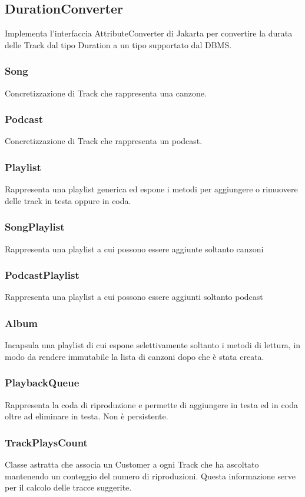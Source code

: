\documentclass{article}
\begin{document}
  \subsection{DurationConverter}
  Implementa l'interfaccia AttributeConverter di Jakarta per convertire la durata delle Track dal tipo Duration a un tipo supportato dal DBMS.
  \subsubsection{Song}
  Concretizzazione di Track che rappresenta una canzone.
  \subsubsection{Podcast}
  Concretizzazione di Track che rappresenta un podcast.
  \subsubsection{Playlist}
  Rappresenta una playlist generica ed espone i metodi per aggiungere o rimuovere\\ delle track in testa oppure in coda.

  \subsubsection{SongPlaylist}
  Rappresenta una playlist a cui possono essere aggiunte soltanto canzoni

  \subsubsection{PodcastPlaylist}
  Rappresenta una playlist a cui possono essere aggiunti soltanto podcast
  \subsubsection{Album}
  Incapsula una playlist di cui espone selettivamente soltanto i metodi di lettura, in modo da rendere immutabile la lista di canzoni dopo che è stata creata.
  \subsubsection{PlaybackQueue}
  Rappresenta la coda di riproduzione e permette di aggiungere in testa ed in coda oltre ad eliminare in testa. Non è persistente.

  \subsubsection{TrackPlaysCount}
  Classe astratta che associa un Customer a ogni Track che ha ascoltato mantenendo un conteggio del numero di riproduzioni. Questa informazione serve per il calcolo delle tracce suggerite.
\end{document}
